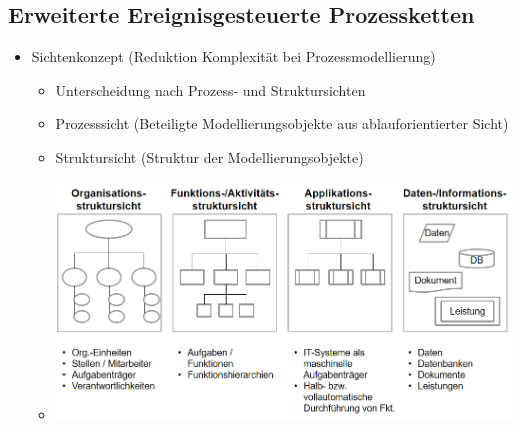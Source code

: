\documentclass[11pt,a4paper]{article}
\begin{document}
\subsection{Erweiterte Ereignisgesteuerte Prozessketten}
\begin{itemize}
	\item Sichtenkonzept (Reduktion Komplexität bei Prozessmodellierung)
		\begin{itemize}
		\item Unterscheidung nach Prozess- und Struktursichten
		\item Prozesssicht (Beteiligte Modellierungsobjekte aus ablauforientierter Sicht)
		\item Struktursicht (Struktur der Modellierungsobjekte)
		\item[] \includegraphics[width=15cm]{sichten}
		\end{itemize}
	

\end{itemize}
\end{document}
